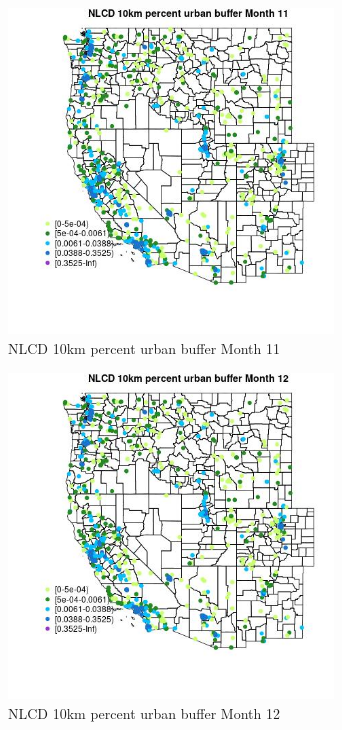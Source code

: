 \begin{figure} 
\centering  
\includegraphics[width=0.77\textwidth]{Code_Outputs/Report_ML_input_PM25_Step4_part_f_de_duplicated_aves_prioritize_24hr_obswNAs_MapObsMo11NLCD_10km_percent_urban_buffer.jpg} 
\caption{\label{fig:Report_ML_input_PM25_Step4_part_f_de_duplicated_aves_prioritize_24hr_obswNAsMapObsMo11NLCD_10km_percent_urban_buffer}NLCD 10km percent urban buffer Month 11} 
\end{figure} 
 

\begin{figure} 
\centering  
\includegraphics[width=0.77\textwidth]{Code_Outputs/Report_ML_input_PM25_Step4_part_f_de_duplicated_aves_prioritize_24hr_obswNAs_MapObsMo12NLCD_10km_percent_urban_buffer.jpg} 
\caption{\label{fig:Report_ML_input_PM25_Step4_part_f_de_duplicated_aves_prioritize_24hr_obswNAsMapObsMo12NLCD_10km_percent_urban_buffer}NLCD 10km percent urban buffer Month 12} 
\end{figure} 
 

